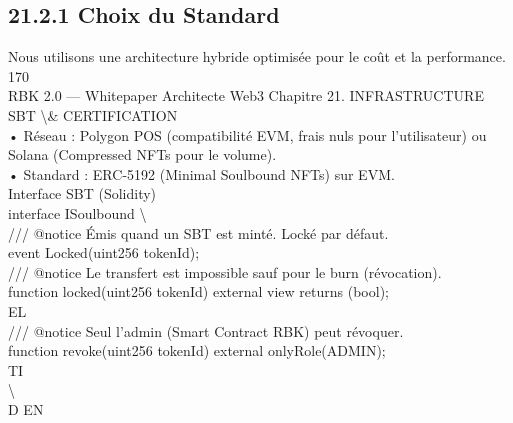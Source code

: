 \documentclass[12pt,landscape,a4paper]{article}
\begin{document}
\subsection{21.2.1 Choix du Standard}
Nous utilisons une architecture hybride optimisée pour le coût et la performance.\\
\vspace{0.5em}
\vspace{0.5em}
\vspace{0.5em}
170\\
RBK 2.0 — Whitepaper Architecte Web3                                                   Chapitre 21. INFRASTRUCTURE SBT \textbackslash{}& CERTIFICATION\\
\vspace{0.5em}
\vspace{0.5em}
• Réseau : Polygon POS (compatibilité EVM, frais nuls pour l’utilisateur) ou Solana (Compressed NFTs pour le volume).\\
\vspace{0.5em}
• Standard : ERC-5192 (Minimal Soulbound NFTs) sur EVM.\\
\vspace{0.5em}
Interface SBT (Solidity)\\
\vspace{0.5em}
\vspace{0.5em}
interface ISoulbound \textbackslash{}{\\
/// @notice Émis quand un SBT est minté. Locké par défaut.\\
event Locked(uint256 tokenId);\\
/// @notice Le transfert est impossible sauf pour le burn (révocation).\\
function locked(uint256 tokenId) external view returns (bool);\\
\vspace{0.5em}
\vspace{0.5em}
\vspace{0.5em}
\vspace{0.5em}
EL\\
/// @notice Seul l'admin (Smart Contract RBK) peut révoquer.\\
function revoke(uint256 tokenId) external onlyRole(ADMIN);\\
\vspace{0.5em}
\vspace{0.5em}
\vspace{0.5em}
\vspace{0.5em}
TI\\
\textbackslash{}}\\
\vspace{0.5em}
\vspace{0.5em}
\vspace{0.5em}
\vspace{0.5em}
D      EN\\
\end{document}
